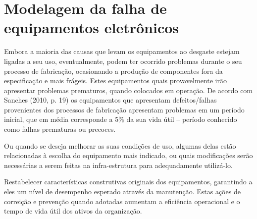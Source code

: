 \section{Modelagem da falha de equipamentos eletrônicos}

Embora a maioria das causas que levam os equipamentos ao desgaste estejam ligadas a seu uso, eventualmente, podem ter ocorrido problemas durante o seu processo de fabricação, ocasionando a produção de componentes fora da especificação e mais frágeis. Estes equipamentos quais provavelmente irão apresentar problemas prematuros, quando colocados em operação. De acordo com Sanches (2010, p. 19) os equipamentos que apresentam defeitos/falhas provenientes dos processos de fabricação apresentam problemas em um período inicial, que em média corresponde a 5\% da sua vida útil – período conhecido como falhas prematuras ou precoces.

Ou quando se deseja melhorar as suas condições de uso, algumas delas estão relacionadas à escolha do equipamento mais indicado, ou quais modificações serão necessárias a serem feitas na infra-estrutura para adequadamente utilizá-lo.

Restabelecer características construtivas originais dos equipamentos, garantindo a eles um nível de desempenho esperado através da manutenção. 
Estas ações de correição e prevenção quando adotadas aumentam a eficiência operacional e o tempo de vida útil dos ativos da organização.

